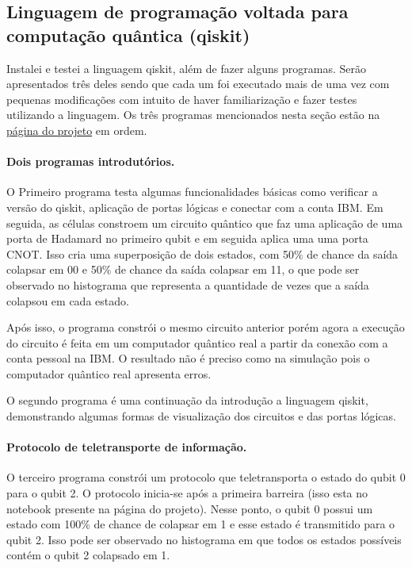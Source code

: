 \documentclass{article}
\begin{document}
    \subsection{Linguagem de programação voltada para computação quântica (qiskit)}
        Instalei e testei a linguagem qiskit, além de fazer alguns programas. Serão apresentados três deles sendo que cada um foi executado mais de uma vez com pequenas modificações com intuito de haver familiarização e fazer testes utilizando a linguagem. Os três programas mencionados nesta seção estão na \href{https://interscity.org/quantum-internet/}{página do projeto} em ordem.
    
        \paragraph{Dois programas introdutórios.}
        O Primeiro programa testa algumas funcionalidades básicas como verificar a versão do qiskit, aplicação de portas lógicas e conectar com a conta IBM. Em seguida, as células constroem um circuito quântico que faz uma aplicação de uma porta de Hadamard no primeiro qubit e em seguida aplica uma uma porta CNOT. Isso cria uma superposição de dois estados, com 50\% de chance da saída colapsar em 00 e 50\% de chance da saída colapsar em 11, o que pode ser observado no histograma que representa a quantidade de vezes que a saída colapsou em cada estado. 
        
        Após isso, o programa constrói o mesmo circuito anterior porém agora a execução do circuito é feita em um computador quântico real a partir da conexão com a conta pessoal na IBM. O resultado não é preciso como na simulação pois o computador quântico real apresenta erros. 
    
        O segundo programa é uma continuação da introdução a linguagem qiskit, demonstrando algumas formas de visualização dos circuitos e das portas lógicas.
        
        \paragraph{Protocolo de teletransporte de informação.}    
        O terceiro programa constrói um protocolo que teletransporta o estado do qubit 0 para o qubit 2. O protocolo inicia-se após a primeira barreira (isso esta no notebook presente na página do projeto). Nesse ponto, o qubit 0 possui um estado com 100\% de chance de colapsar em 1 e esse estado é transmitido para o qubit 2. Isso pode ser observado no histograma em que todos os estados possíveis contém o qubit 2 colapsado em 1.
\end{document}
